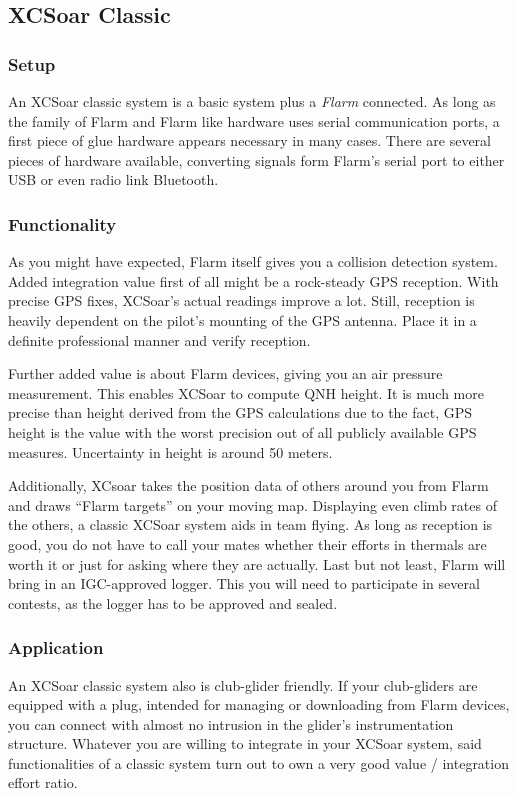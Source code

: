 \subsection*{XCSoar Classic}
\subsubsection*{Setup} An XCSoar classic system is a basic system plus a 
\emph{Flarm} connected. As long as the family of Flarm and Flarm like hardware 
uses serial communication ports, a first piece of glue hardware appears necessary 
in many cases. There are several pieces of hardware available, converting signals 
form Flarm's serial port to either USB or even radio link Bluetooth.

\subsubsection*{Functionality} As you might have expected, Flarm itself gives you 
a collision detection system. Added integration value first of all might be a 
rock-steady GPS reception. With precise GPS fixes, XCSoar's actual readings 
improve a lot. Still, reception is heavily dependent on the pilot's mounting of 
the GPS antenna. Place it in a definite professional manner and verify reception.

Further added value is about Flarm devices, giving you an air pressure 
measurement. This enables XCSoar to compute QNH height. It is much more precise 
than height derived from the GPS calculations due to the fact, GPS height is the 
value with the worst precision out of all publicly available GPS measures. 
Uncertainty in height is around 50 meters.

Additionally, XCsoar takes the position data of others around you from Flarm and 
draws ``Flarm targets'' on your moving map. Displaying even climb rates of the
others, a classic XCSoar system aids in team flying. As long as reception is 
good, you do not have to call your mates whether their efforts in thermals are 
worth it or just for asking where they are actually. Last but not least, Flarm 
will bring in an IGC-approved logger. This you will need to participate in 
several contests, as the logger has to be approved and sealed.

\subsubsection*{Application} An XCSoar classic system also is club-glider 
friendly. If your club-gliders are equipped with a plug, intended for managing or 
downloading from Flarm devices, you can connect with almost no intrusion in the 
glider's instrumentation structure. Whatever you are willing to integrate in your 
XCSoar system, said functionalities of a classic system turn out to own a very 
good value / integration effort ratio.

